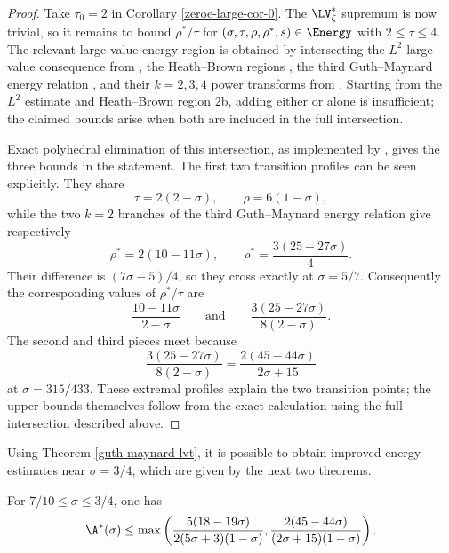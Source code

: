 \begin{proof}
Take $\tau_0=2$ in Corollary \ref{zeroe-large-cor-0}. The $\LV^*_{\zeta}$ supremum is now trivial, so it remains to bound $\rho^*/\tau$ for $(\sigma,\tau,\rho,\rho^*,s)\in\Energy$ with $2\leq\tau\leq4$. The relevant large-value-energy region is obtained by intersecting the $L^2$ large-value consequence from , the Heath--Brown regions , the third Guth--Maynard energy relation , and their $k=2,3,4$ power transforms from . Starting from the $L^2$ estimate and Heath--Brown region 2b, adding either  or  alone is insufficient; the claimed bounds arise when both are included in the full intersection.

Exact polyhedral elimination of this intersection, as implemented by , gives the three bounds in the statement. The first two transition profiles can be seen explicitly. They share
\[
\tau=2(2-\sigma), \qquad \rho=6(1-\sigma),
\]
while the two $k=2$ branches of the third Guth--Maynard energy relation give respectively
\[
\rho^*=2(10-11\sigma), \qquad \rho^*=\frac{3(25-27\sigma)}{4}.
\]
Their difference is $(7\sigma-5)/4$, so they cross exactly at $\sigma=5/7$. Consequently the corresponding values of $\rho^*/\tau$ are
\[
\frac{10-11\sigma}{2-\sigma}
\qquad\text{and}\qquad
\frac{3(25-27\sigma)}{8(2-\sigma)}.
\]
The second and third pieces meet because
\[
\frac{3(25-27\sigma)}{8(2-\sigma)}
=\frac{2(45-44\sigma)}{2\sigma+15}
\]
at $\sigma=315/433$. These extremal profiles explain the two transition points; the upper bounds themselves follow from the exact calculation using the full intersection described above.
\end{proof}

Using Theorem \ref{guth-maynard-lvt}, it is possible to obtain improved energy estimates near $\sigma = 3/4$, which are given by the next two theorems.

\begin{theorem}\label{imp-energy-bound2}
For $7/10 \le \sigma \le 3/4$, one has
\[
\A^*(\sigma) \le \max\left(\frac{5(18 - 19\sigma)}{2(5\sigma + 3)(1 - \sigma)}, \frac{2(45 - 44\sigma)}{(2\sigma + 15)(1
- \sigma)}\right).
\]
\end{theorem}

\derived
{}

